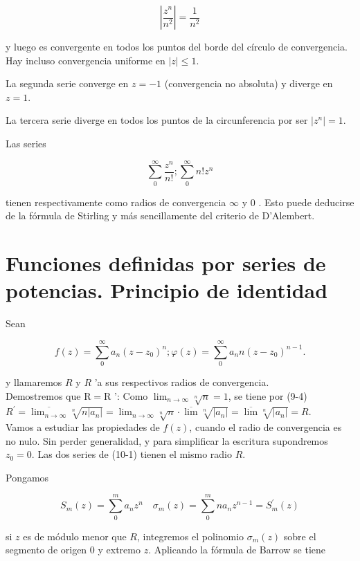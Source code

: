 \documentclass[10pt]{article}
\theoremstyle{plain}
\theoremstyle{definition}
\theoremstyle{remark}
\begin{document}
$$
\left|\frac{z^{n}}{n^{2}}\right|=\frac{1}{n^{2}}
$$

y luego es convergente en todos los puntos del borde del círculo de convergencia. Hay incluso convergencia uniforme en $|z| \leqslant 1$.

La segunda serie converge en $z=-1$ (convergencia no absoluta) y diverge en $z=1$.

La tercera serie diverge en todos los puntos de la circunferencia por ser $\left|z^{n}\right|=1$.

Las series

$$
\sum_{0}^{\infty} \frac{z^{n}}{n!} ; \sum_{0}^{\infty} n!z^{n}
$$

tienen respectivamente como radios de convergencia $\infty$ y 0 . Esto puede deducirse de la fórmula de Stirling y más sencillamente del criterio de D'Alembert.\\
\section{Funciones definidas por series de potencias. Principio de identidad}

Sean


\begin{equation*}
f(z)=\sum_{0}^{\infty} a_{n}\left(z-z_{0}\right)^{n} ; \varphi(z)=\sum_{0}^{\infty} a_{n} n\left(z-z_{0}\right)^{n-1} . \tag{10-1}
\end{equation*}


y llamaremos $R$ y $R$ 'a sus respectivos radios de convergencia.\\
Demostremos que $\mathrm{R}=\mathrm{R}$ ': Como $\lim _{n \rightarrow \infty} \sqrt[n]{n}=1$, se tiene por (9-4)\\
$R^{\prime}=\overline{\lim _{n \rightarrow \infty}} \sqrt[n]{n\left|a_{n}\right|}=\lim _{n \rightarrow \infty} \sqrt[n]{n} \cdot \overline{\lim } \sqrt[n]{\left|a_{n}\right|}=\overline{\lim } \sqrt[n]{\left|a_{n}\right|}=R$.\\
Vamos a estudiar las propiedades de $f(z)$, cuando el radio de convergencia es no nulo. Sin perder generalidad, y para simplificar la escritura supondremos $z_{0}=0$. Las dos series de (10-1) tienen el mismo radio $R$.

Pongamos

$$
S_{m}(z)=\sum_{0}^{m} a_{n} z^{n} \quad \sigma_{m}(z)=\sum_{0}^{m} n a_{n} z^{n-1}=S_{m}^{\prime}(z)
$$

si $z$ es de módulo menor que $R$, integremos el polinomio $\sigma_{m}(z)$ sobre el segmento de origen 0 y extremo $z$. Aplicando la fórmula de Barrow se tiene
\end{document}
